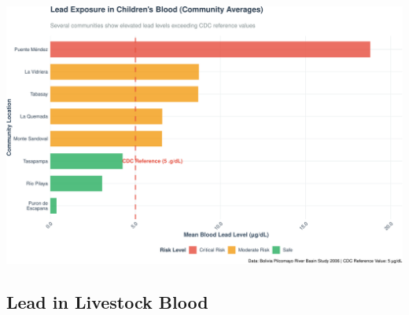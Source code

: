 \documentclass[
]{article}
\begin{document}
\includegraphics{WHO_standards_pdf_02_files/figure-latex/human-lead-1.pdf}

\subsection{Lead in Livestock Blood}\label{lead-in-livestock-blood}
\end{document}
